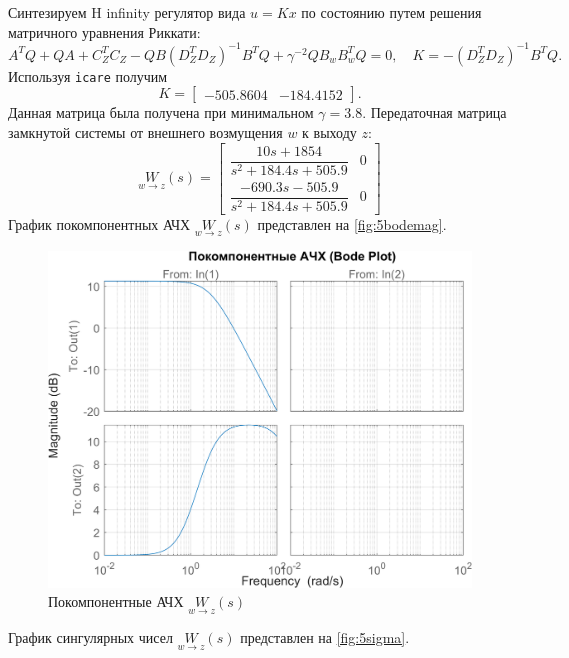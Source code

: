 Синтезируем H infinity регулятор вида $u=Kx$ по состоянию путем решения матричного
уравнения Риккати:
\begin{equation}
    \label{eq:ric3}
    A^TQ+QA+C_Z^TC_Z-QB(D_Z^TD_Z)^{-1}B^TQ+\gamma^{-2}QB_wB_w^TQ=0,\quad K=-(D_Z^TD_Z)^{-1}B^TQ.
\end{equation}
Используя \texttt{icare} получим
\begin{equation*}
    K=\begin{bmatrix}
        -505.8604	&-184.4152
    \end{bmatrix}.
\end{equation*}
Данная матрица была получена при минимальном $\gamma=3.8$.
Передаточная матрица замкнутой системы от внешнего возмущения $w$ к выходу $z$:
\begin{equation*}
    \underset{w\rightarrow z}{W}(s)=\begin{bmatrix}
        \dfrac{10 s + 1854}{s^2 + 184.4 s + 505.9} & 0 \\[2ex]
        \dfrac{-690.3 s - 505.9}{s^2 + 184.4 s + 505.9} & 0
    \end{bmatrix}
\end{equation*}
График покомпонентных АЧХ $\underset{w\rightarrow z}{W}(s)$ представлен на \autoref{fig:5bodemag}.
\begin{figure}[H]
    \centering
    \includegraphics[width=0.8\linewidth]{figs/5_bodemag.png}
    \caption{Покомпонентные АЧХ $\underset{w\rightarrow z}{W}(s)$}
    \label{fig:5bodemag}
\end{figure}
График сингулярных чисел $\underset{w\rightarrow z}{W}(s)$ представлен на \autoref{fig:5sigma}.
